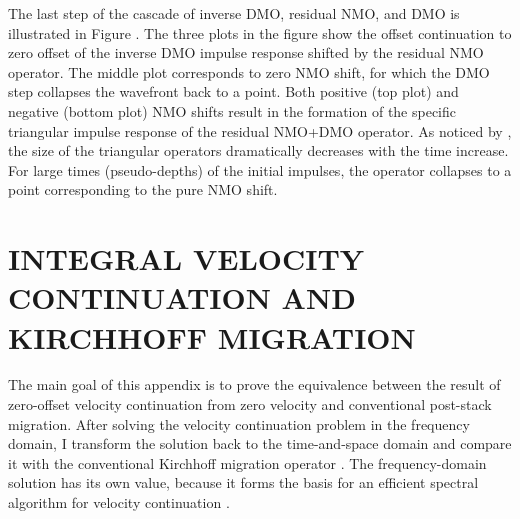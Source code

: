 The last step of the cascade of inverse DMO, residual NMO, and DMO is
illustrated in Figure . The three plots in the figure show
the offset continuation to zero offset of the inverse DMO impulse
response shifted by the residual NMO operator. The middle plot
corresponds to zero NMO shift, for which the DMO step collapses the
wavefront back to a point.  Both positive (top plot) and negative
(bottom plot) NMO shifts result in the formation of the specific
triangular impulse response of the residual NMO+DMO operator. As
noticed by \cite{Etgen.sepphd.68}, the size of the triangular
operators dramatically decreases with the time increase.  For large
times (pseudo-depths) of the initial impulses, the operator collapses
to a point corresponding to the pure NMO shift.


\section{INTEGRAL VELOCITY CONTINUATION AND KIRCHHOFF MIGRATION}
The main goal of this appendix is to prove the equivalence between the
result of zero-offset velocity continuation from zero velocity and
conventional post-stack migration. After solving the velocity
continuation problem in the frequency domain, I transform the solution
back to the time-and-space domain and compare it with the conventional
Kirchhoff migration operator \cite[]{GEO43-01-00490076}. The frequency-domain
solution has its own value, because it forms the basis for an efficient
spectral algorithm for velocity continuation \cite[]{second}. 
 
